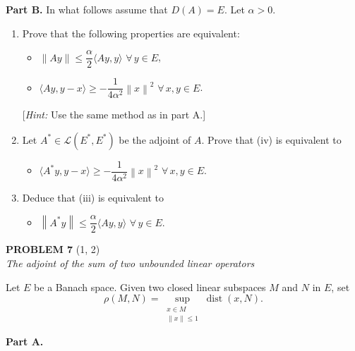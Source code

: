 \documentclass[12pt]{article}
\newcommand{\norm}[1]{\left\|#1\right\|}
\newcommand{\ip}[2]{\langle #1, #2 \rangle}
\begin{document}
\noindent\textbf{Part B.} In what follows assume that $D(A) = E$. Let $\alpha > 0$.

\begin{enumerate}
\item Prove that the following properties are equivalent:
\begin{itemize}
    \item[(iii)] $\norm{Ay} \le \dfrac{\alpha}{2}\ip{Ay}{y}$ $\forall\, y \in E$,
    \item[(iv)] $\ip{Ay}{y-x} \ge -\dfrac{1}{4\alpha^2}\norm{x}^2$ $\forall\, x, y \in E$.
\end{itemize}
[\textit{Hint:} Use the same method as in part A.]

\item Let $A^* \in \mathcal{L}(E^*, E^*)$ be the adjoint of $A$. Prove that (iv) is equivalent to
\begin{itemize}
    \item[(iv$'$)] $\ip{A^* y}{y-x} \ge -\dfrac{1}{4\alpha^2}\norm{x}^2$ $\forall\, x, y \in E$.
\end{itemize}

\item Deduce that (iii) is equivalent to
\begin{itemize}
    \item[(iii$'$)] $\norm{A^* y} \le \dfrac{\alpha}{2}\ip{Ay}{y}$ $\forall\, y \in E$.
\end{itemize}
\end{enumerate}

\bigskip

\noindent\textbf{PROBLEM 7} (1, 2)\\[4pt]
\textit{The adjoint of the sum of two unbounded linear operators}

\medskip

Let $E$ be a Banach space. Given two closed linear subspaces $M$ and $N$ in $E$, set
\[
\rho(M,N) = \sup_{\substack{x \in M \\ \norm{x} \le 1}} \operatorname{dist}(x, N).
\]

\noindent\textbf{Part A.}
\end{document}

